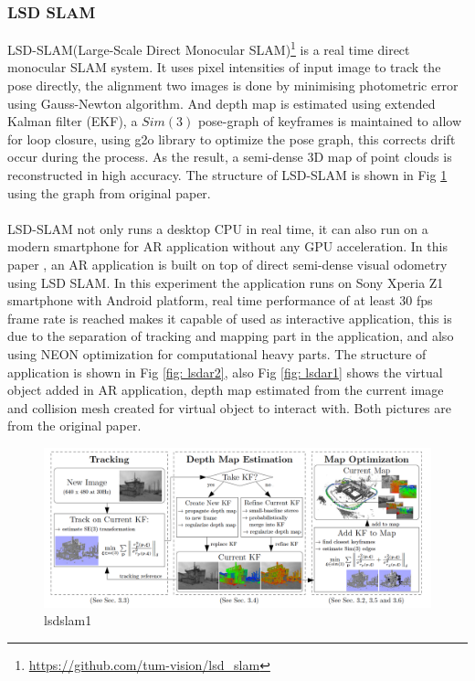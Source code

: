 \documentclass[12pt,twoside]{article}
\begin{document}
\subsubsection{LSD SLAM}
LSD-SLAM(Large-Scale Direct Monocular SLAM)\citep{engel2014lsd}\footnote{\url{https://github.com/tum-vision/lsd_slam}} is a real time direct monocular SLAM system. It uses pixel intensities of input image to track the pose directly, the alignment two images is done by minimising photometric error using Gauss-Newton algorithm. And depth map is estimated using extended Kalman filter (EKF), a $Sim(3)$ pose-graph of keyframes is maintained to allow for loop closure, using g2o library to optimize the pose graph, this corrects drift occur during the process. As the result, a semi-dense 3D map of point clouds is reconstructed in high accuracy. The structure of LSD-SLAM is shown in Fig \ref{fig: lsdslam1} using the graph from original paper.\\
\\
LSD-SLAM not only runs a desktop CPU in real time, it can also run on a modern smartphone for AR application without any GPU acceleration. In this paper \citep{schops2014semi}, an AR application is built on top of direct semi-dense visual odometry using LSD SLAM. In this experiment the application runs on Sony Xperia Z1 smartphone with Android platform, real time performance of at least 30 fps frame rate is reached makes it  capable of used as interactive application, this is due to the separation of tracking and mapping part in the application, and also using NEON optimization for computational heavy parts. The structure of application is shown in Fig \ref{fig: lsdar2}, also Fig \ref{fig: lsdar1} shows the virtual object added in AR application, depth map estimated from the current image and collision mesh created for virtual object to interact with. Both pictures are from the original paper.

\begin{figure}[h]
    \centering
    \includegraphics[width=1.0\textwidth]{figures/lsdslam1}
    \caption{lsdslam1}
    \label{fig: lsdslam1}
\end{figure}
\end{document}
